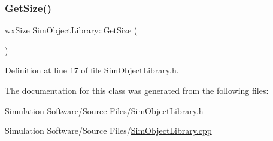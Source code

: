 \subsubsection{\texorpdfstring{Get\+Size()}{GetSize()}}
{\footnotesize\ttfamily wx\+Size Sim\+Object\+Library\+::\+Get\+Size (\begin{DoxyParamCaption}{ }\end{DoxyParamCaption})\hspace{0.3cm}{\ttfamily [inline]}}



Definition at line 17 of file Sim\+Object\+Library.\+h.



The documentation for this class was generated from the following files\+:\begin{DoxyCompactItemize}
\item 
Simulation Software/\+Source Files/\hyperlink{_sim_object_library_8h}{Sim\+Object\+Library.\+h}\item 
Simulation Software/\+Source Files/\hyperlink{_sim_object_library_8cpp}{Sim\+Object\+Library.\+cpp}\end{DoxyCompactItemize}
